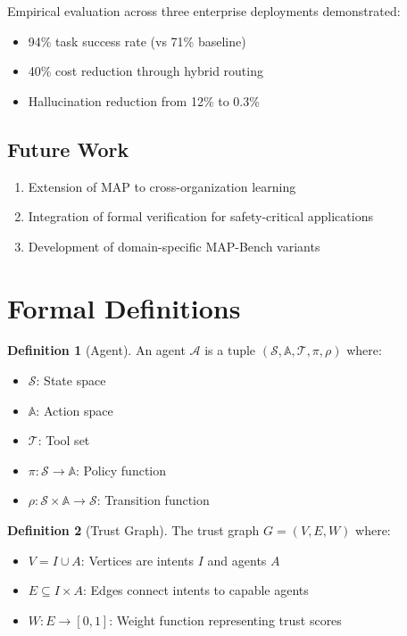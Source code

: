\documentclass[11pt,a4paper]{article}
\theoremstyle{definition}
\newtheorem{definition}{Definition}[section]
\theoremstyle{remark}
\newcommand{\map}{\textsc{MAP}\xspace}
\begin{document}
Empirical evaluation across three enterprise deployments demonstrated:
\begin{itemize}
    \item 94\% task success rate (vs 71\% baseline)
    \item 40\% cost reduction through hybrid routing
    \item Hallucination reduction from 12\% to 0.3\%
\end{itemize}

\subsection{Future Work}

\begin{enumerate}
    \item Extension of \map to cross-organization learning
    \item Integration of formal verification for safety-critical applications
    \item Development of domain-specific MAP-Bench variants
\end{enumerate}


\appendix

\section{Formal Definitions}
\label{sec:formal-definitions}

\begin{definition}[Agent]
An agent $\mathcal{A}$ is a tuple $(\mathcal{S}, \mathbb{A}, \mathcal{T}, \pi, \rho)$ where:
\begin{itemize}
    \item $\mathcal{S}$: State space
    \item $\mathbb{A}$: Action space
    \item $\mathcal{T}$: Tool set
    \item $\pi: \mathcal{S} \rightarrow \mathbb{A}$: Policy function
    \item $\rho: \mathcal{S} \times \mathbb{A} \rightarrow \mathcal{S}$: Transition function
\end{itemize}
\end{definition}

\begin{definition}[Trust Graph]
The trust graph $G = (V, E, W)$ where:
\begin{itemize}
    \item $V = I \cup A$: Vertices are intents $I$ and agents $A$
    \item $E \subseteq I \times A$: Edges connect intents to capable agents
    \item $W: E \rightarrow [0,1]$: Weight function representing trust scores
\end{itemize}
\end{definition}
\end{document}
